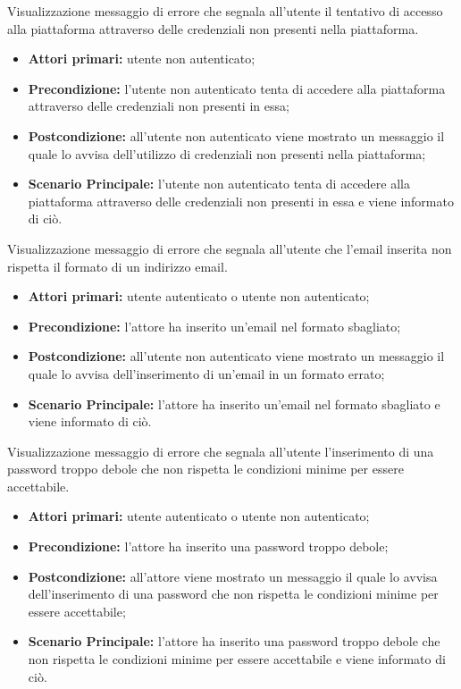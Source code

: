 Visualizzazione messaggio di errore che segnala all'utente il tentativo di accesso alla piattaforma attraverso delle credenziali non presenti nella piattaforma.
\begin{itemize}
    \item \textbf{Attori primari:} utente non autenticato;
    \item \textbf{Precondizione:} l'utente non autenticato tenta di accedere alla piattaforma attraverso delle credenziali non presenti in essa;
    \item \textbf{Postcondizione:} all'utente non autenticato viene mostrato un messaggio il quale lo avvisa dell'utilizzo di credenziali non presenti nella piattaforma;
    \item \textbf{Scenario Principale:} l'utente non autenticato tenta di accedere alla piattaforma attraverso delle credenziali non presenti in essa e viene informato di ciò.
\end{itemize}

Visualizzazione messaggio di errore che segnala all'utente che l'email inserita non rispetta il formato di un indirizzo email.
\begin{itemize}
    \item \textbf{Attori primari:} utente autenticato o utente non autenticato;
    \item \textbf{Precondizione:} l'attore ha inserito un'email nel formato sbagliato;
    \item \textbf{Postcondizione:} all'utente non autenticato viene mostrato un messaggio il quale lo avvisa dell'inserimento di un'email in un formato errato;
    \item \textbf{Scenario Principale:} l'attore ha inserito un'email nel formato sbagliato e viene informato di ciò.
\end{itemize}

Visualizzazione messaggio di errore che segnala all'utente l'inserimento di una password troppo debole che non rispetta le condizioni minime per essere accettabile.
\begin{itemize}
    \item \textbf{Attori primari:} utente autenticato o utente non autenticato;
    \item \textbf{Precondizione:} l'attore ha inserito una password troppo debole;
    \item \textbf{Postcondizione:} all'attore viene mostrato un messaggio il quale lo avvisa dell'inserimento di una password che non rispetta le condizioni minime per essere accettabile;
    \item \textbf{Scenario Principale:} l'attore ha inserito una password troppo debole che non rispetta le condizioni minime per essere accettabile e viene informato di ciò.
\end{itemize}

